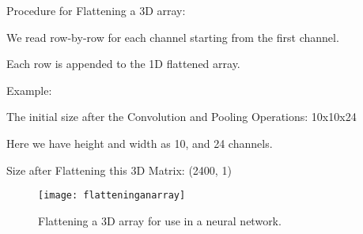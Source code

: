 \vspace{\baselineskip}
Procedure for Flattening a 3D array:
	\begin{numberedlist}
		\item We read row-by-row for each channel starting from the first channel.
		\item Each row is appended to the 1D flattened array.
	\end{numberedlist}

\vspace{\baselineskip}
Example:
	\begin{bulletedlist}
		\item The initial size after the Convolution and Pooling Operations: 10x10x24
		\item Here we have height and width as 10, and 24 channels.
		\item Size after Flattening this 3D Matrix: (2400, 1)
	\end{bulletedlist}

	\begin{figure}[h]
		\centering
		\texttt{[image: flatteninganarray]}
		\caption[Flattening a 3D array]{Flattening a 3D array for use in a neural network.}
		\label{fig:flatteninganarray}
	\end{figure}
